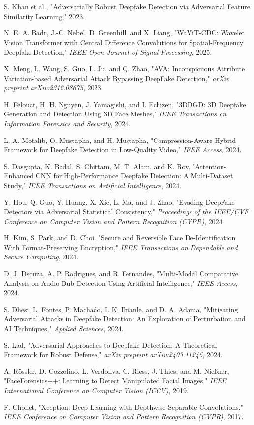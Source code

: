 \documentclass[a4paper,12pt]{article}
\begin{document}
\begin{thebibliography}{99}

S. Khan et al., "Adversarially Robust Deepfake Detection via Adversarial Feature Similarity Learning," 2023.

N. E. A. Badr, J.-C. Nebel, D. Greenhill, and X. Liang, "WaViT-CDC: Wavelet Vision Transformer with Central Difference Convolutions for Spatial-Frequency Deepfake Detection," \textit{IEEE Open Journal of Signal Processing}, 2025.

X. Meng, L. Wang, S. Guo, L. Ju, and Q. Zhao, "AVA: Inconspicuous Attribute Variation-based Adversarial Attack Bypassing DeepFake Detection," \textit{arXiv preprint arXiv:2312.08675}, 2023.

H. Felouat, H. H. Nguyen, J. Yamagishi, and I. Echizen, "3DDGD: 3D Deepfake Generation and Detection Using 3D Face Meshes," \textit{IEEE Transactions on Information Forensics and Security}, 2024.

L. A. Motalib, O. Mustapha, and H. Mustapha, "Compression-Aware Hybrid Framework for Deepfake Detection in Low-Quality Video," \textit{IEEE Access}, 2024.

S. Dasgupta, K. Badal, S. Chittam, M. T. Alam, and K. Roy, "Attention-Enhanced CNN for High-Performance Deepfake Detection: A Multi-Dataset Study," \textit{IEEE Transactions on Artificial Intelligence}, 2024.

Y. Hou, Q. Guo, Y. Huang, X. Xie, L. Ma, and J. Zhao, "Evading DeepFake Detectors via Adversarial Statistical Consistency," \textit{Proceedings of the IEEE/CVF Conference on Computer Vision and Pattern Recognition (CVPR)}, 2024.

H. Kim, S. Park, and D. Choi, "Secure and Reversible Face De-Identification With Format-Preserving Encryption," \textit{IEEE Transactions on Dependable and Secure Computing}, 2024.

D. J. Dsouza, A. P. Rodrigues, and R. Fernandes, "Multi-Modal Comparative Analysis on Audio Dub Detection Using Artificial Intelligence," \textit{IEEE Access}, 2024.

S. Dhesi, L. Fontes, P. Machado, I. K. Ihianle, and D. A. Adama, "Mitigating Adversarial Attacks in Deepfake Detection: An Exploration of Perturbation and AI Techniques," \textit{Applied Sciences}, 2024.

S. Lad, "Adversarial Approaches to Deepfake Detection: A Theoretical Framework for Robust Defense," \textit{arXiv preprint arXiv:2403.11245}, 2024.

A. Rössler, D. Cozzolino, L. Verdoliva, C. Riess, J. Thies, and M. Nießner, "FaceForensics++: Learning to Detect Manipulated Facial Images," \textit{IEEE International Conference on Computer Vision (ICCV)}, 2019.

F. Chollet, "Xception: Deep Learning with Depthwise Separable Convolutions," \textit{IEEE Conference on Computer Vision and Pattern Recognition (CVPR)}, 2017.

\end{thebibliography}
\end{document}
